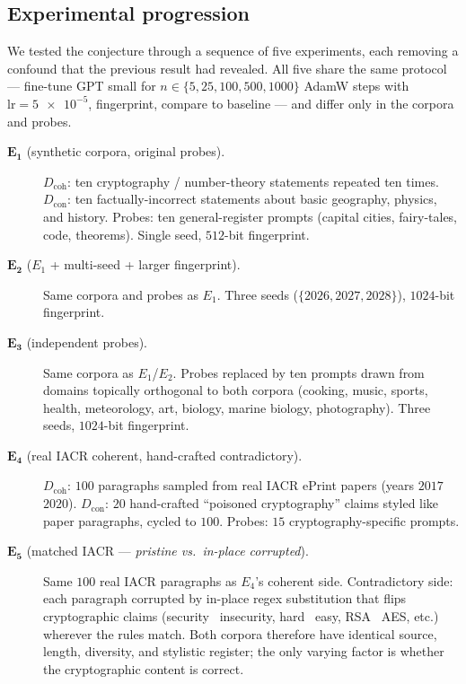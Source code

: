 \documentclass[11pt,a4paper]{article}
\begin{document}
\subsection{Experimental progression}
\label{sec:poisoning:progression}

We tested the conjecture through a sequence of five experiments,
each removing a confound that the previous result had revealed.
All five share the same protocol — fine\nobreakdash-tune
GPT small for $n \in \{5, 25, 100, 500, 1000\}$
AdamW steps with $\mathrm{lr} = \num{5e-5}$, fingerprint, compare
to baseline — and differ only in the corpora and probes.

\begin{description}
  \item[$\mathbf{E_1}$ (synthetic corpora, original probes).]
    $D_{\mathrm{coh}}$: ten cryptography / number\nobreakdash-theory
    statements repeated ten times.  $D_{\mathrm{con}}$: ten
    factually\nobreakdash-incorrect statements about basic
    geography, physics, and history.  Probes: ten general-register
    prompts (capital cities, fairy\nobreakdash-tales, code,
    theorems).  Single seed, $512$\nobreakdash-bit fingerprint.

  \item[$\mathbf{E_2}$ ($E_1$ + multi-seed + larger fingerprint).]
    Same corpora and probes as $E_1$.  Three seeds
    ($\{2026, 2027, 2028\}$), $1024$\nobreakdash-bit fingerprint.

  \item[$\mathbf{E_3}$ (independent probes).]
    Same corpora as $E_1$/$E_2$.  Probes replaced by ten prompts
    drawn from domains topically orthogonal to both corpora
    (cooking, music, sports, health, meteorology, art, biology,
    marine biology, photography).  Three seeds,
    $1024$\nobreakdash-bit fingerprint.

  \item[$\mathbf{E_4}$ (real IACR coherent, hand\nobreakdash-crafted
    contradictory).]
    $D_{\mathrm{coh}}$: $100$ paragraphs sampled from real IACR
    ePrint papers (years $2017$\textendash$2020$).
    $D_{\mathrm{con}}$: $20$ hand\nobreakdash-crafted ``poisoned
    cryptography'' claims styled like paper paragraphs, cycled to
    $100$.  Probes: $15$ cryptography\nobreakdash-specific prompts.

  \item[$\mathbf{E_5}$ (matched IACR — \emph{pristine vs.\
    in\nobreakdash-place corrupted}).]
    Same $100$ real IACR paragraphs as $E_4$'s coherent side.
    Contradictory side: each paragraph corrupted by in\nobreakdash-place
    regex substitution that flips cryptographic claims (security
    \textrightarrow\ insecurity, hard \textrightarrow\ easy, RSA
    \textrightarrow\ AES, etc.) wherever the rules match.  Both
    corpora therefore have identical source, length, diversity,
    and stylistic register; the only varying factor is whether
    the cryptographic content is correct.


\end{description}
\end{document}
